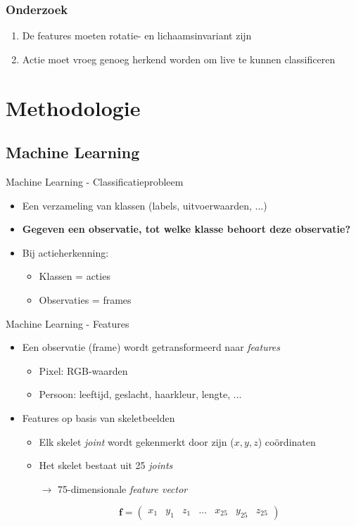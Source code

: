 \documentclass[]{beamer}
\begin{document}
	\begin{frame}\frametitle{Onderzoek}
		\begin{enumerate}
			\item De features moeten rotatie- en lichaamsinvariant zijn
			\item Actie moet vroeg genoeg herkend worden om live te kunnen classificeren
		\end{enumerate}
	\end{frame}


	\section{Methodologie}
	\subsection{Machine Learning}
	\begin{frame}{Machine Learning - Classificatieprobleem}
			\begin{itemize}
				\item Een verzameling van klassen (labels, uitvoerwaarden, ...)
				\item \textbf{Gegeven een observatie, tot welke klasse behoort deze observatie?}
				\item Bij actieherkenning:
				\begin{itemize}
					\item Klassen = acties
					\item Observaties = frames
				\end{itemize}
			\end{itemize}

	\end{frame}
	
	\begin{frame}{Machine Learning - Features}
		\begin{itemize}
			\item Een observatie (frame) wordt getransformeerd naar \textit{features}
			\begin{itemize}
				\item Pixel: RGB-waarden
				\item Persoon: leeftijd, geslacht, haarkleur, lengte, ...
			\end{itemize}
			\item Features op basis van skeletbeelden
			\begin{itemize}
				\item Elk skelet \textit{joint} wordt gekenmerkt door zijn ($x, y, z$) coördinaten
				\item Het skelet bestaat uit 25 \textit{joints}
				\item[$\rightarrow$] 75-dimensionale \textit{feature vector}
				
				$$\textbf{f} = \begin{pmatrix}
				x_1 & y_1 & z_1 & ...&  x_{25} & y_{25} & z_{25}
				\end{pmatrix}$$
			\end{itemize}
		\end{itemize}
		
	\end{frame}
\end{document}
